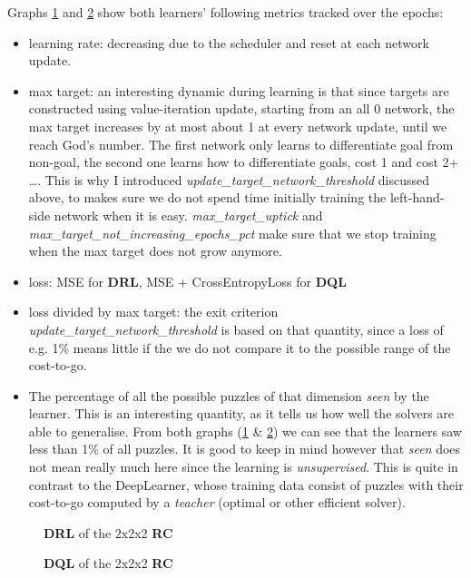 \noindent Graphs \ref{fig:222RCDRL} and \ref{fig:222RCDQL} show both learners' following metrics tracked over the epochs:
\begin{itemize}
\item learning rate: decreasing due to the scheduler and reset at each network update.
\item max target: an interesting dynamic during learning is that since targets are constructed using value-iteration update, starting from an all 0 network, the max target increases by at most about 1 at every network update, until we reach God's number. The first network only learns to differentiate goal from non-goal, the second one learns how to differentiate goals, cost 1 and cost 2+ \dots. This is why I introduced \textit{update\_target\_network\_threshold} discussed above, to makes sure we do not spend time initially training the left-hand-side network when it is easy. \textit{max\_target\_uptick} and \textit{max\_target\_not\_increasing\_epochs\_pct} make sure that we stop training when the max target does not grow anymore.
\item loss: MSE for \textbf{DRL}, MSE + CrossEntropyLoss for \textbf{DQL}
\item loss divided by max target: the exit criterion \textit{update\_target\_network\_threshold} is based on that quantity, since a loss of e.g. 1\% means little if the we do not compare it to the possible range of the cost-to-go.
\item The percentage of all the possible puzzles of that dimension \textit{seen} by the learner. This is an interesting quantity, as it tells us how well the solvers are able to generalise. From both graphs (\ref{fig:222RCDRL} \& \ref{fig:222RCDQL}) we can see that the learners saw less than 1\% of all puzzles. It is good to keep in mind however that \textit{seen} does not mean really much here since the learning is \textit{unsupervised}. This is quite in contrast to the DeepLearner, whose training data consist of puzzles with their cost-to-go computed by a \textit{teacher} (optimal or other efficient solver).
\end{itemize}


\begin{figure}[H]
  \noindent
  \caption[222RCDRL]{\textbf{DRL} of the 2x2x2 \textbf{RC}}
  \label{fig:222RCDRL}
\end{figure}

\begin{figure}[H]
  \noindent
  \caption[222RCDQL]{\textbf{DQL} of the 2x2x2 \textbf{RC}}
  \label{fig:222RCDQL}
\end{figure}




